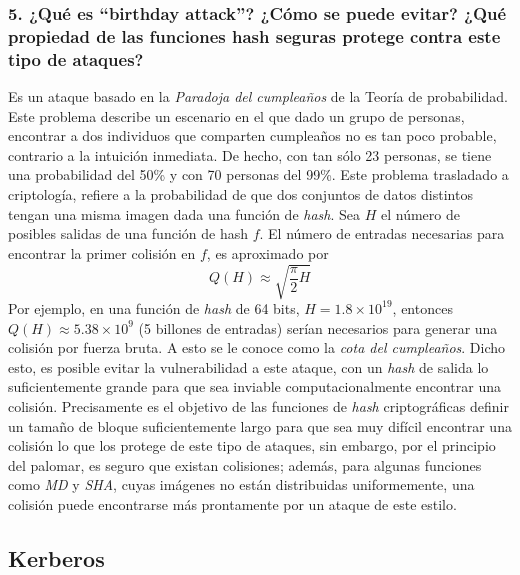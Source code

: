 \documentclass[12pt]{article}
\begin{document}
\subsubsection*{5. ¿Qué es “birthday attack”? ¿Cómo se puede evitar? ¿Qué propiedad de las funciones hash seguras protege contra este tipo de ataques?}
Es un ataque basado en la \textit{Paradoja del cumpleaños} de la Teoría
de probabilidad. Este problema describe un escenario en el que dado un
grupo de personas, encontrar a dos individuos que comparten cumpleaños
no es tan poco probable, contrario a la intuición inmediata. De hecho,
con tan sólo 23 personas, se tiene una probabilidad del 50\% y con 70 personas del 99\%. Este problema trasladado a criptología, refiere a la
probabilidad de que dos conjuntos de datos distintos tengan una misma
imagen dada una función de \textit{hash}.
Sea $H$ el número de posibles salidas de una función de hash $f$. El número de entradas necesarias para encontrar la primer colisión en $f$, es aproximado por
\begin{equation}
  Q(H) \approx \sqrt{\frac{\pi}{2}H}
\end{equation}
Por ejemplo, en una función de \textit{hash} de 64 bits, $H = 1.8 \times 10^{19}$, entonces $Q(H) \approx 5.38 \times 10^{9}$ (5 billones de entradas) serían necesarios para generar una colisión por fuerza bruta. A esto se le conoce como la \textit{cota del cumpleaños}. Dicho esto, es posible evitar la vulnerabilidad a este ataque, con un \textit{hash} de salida lo suficientemente grande para que sea inviable computacionalmente encontrar una colisión. Precisamente es el objetivo de las funciones de \textit{hash} criptográficas definir un tamaño de bloque suficientemente
largo para que sea muy difícil encontrar una colisión lo que los protege
de este tipo de ataques, sin embargo, por el principio del palomar,
es seguro que existan colisiones; además, para algunas funciones como
\textit{MD} y \textit{SHA}, cuyas imágenes no están distribuidas uniformemente, una colisión puede encontrarse más prontamente por un ataque de este estilo.

\subsection*{Kerberos}
\end{document}

